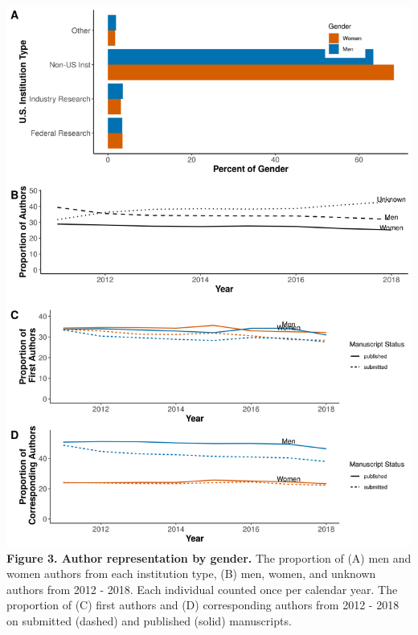 \documentclass[11pt,]{article}
\begin{document}
\includegraphics{Figure_3.png} \textbf{Figure 3. Author representation
by gender.} The proportion of (A) men and women authors from each
institution type, (B) men, women, and unknown authors from 2012 - 2018.
Each individual counted once per calendar year. The proportion of (C)
first authors and (D) corresponding authors from 2012 - 2018 on
submitted (dashed) and published (solid) manuscripts.

\newpage
\end{document}
